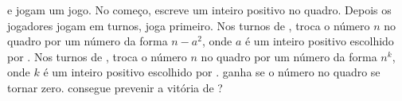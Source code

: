  e  jogam um jogo. 
No começo,  escreve um inteiro positivo no quadro.
Depois os jogadores jogam em turnos,  joga primeiro.
Nos turnos de ,  troca o número $n$ no quadro por um número da forma $n - a^2$, onde $a$ é um inteiro positivo escolhido por .
Nos turnos de ,  troca o número $n$ no quadro por um número da forma $n^k$, onde $k$ é um inteiro positivo escolhido por .
 ganha se o número no quadro se tornar zero.  consegue prevenir a vitória de ?
